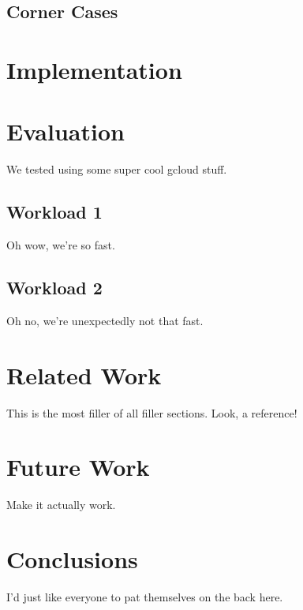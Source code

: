 \documentclass[11pt,english,twocolumn]{article}
\begin{document}
\subsection{Corner Cases}

\section{Implementation}

\section{Evaluation}
We tested using some super cool gcloud stuff.

\subsection{Workload 1}
Oh wow, we're so fast.

\subsection{Workload 2}
Oh no, we're unexpectedly not that fast.

\section{Related Work}
This is the most filler of all filler sections. Look, a reference! \cite{dynamo}

\section{Future Work}
Make it actually work.

\section{Conclusions}
I'd just like everyone to pat themselves on the back here.

 

\end{document}
